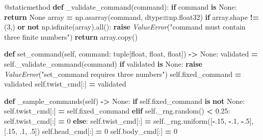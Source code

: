 \documentclass[
  chinese,
  11pt,
  letterpaper,
]{article}
\newenvironment{Shaded}{\begin{snugshade}}{\end{snugshade}}
\newcommand{\AttributeTok}[1]{\textcolor[rgb]{0.13,0.29,0.53}{#1}}
\newcommand{\BuiltInTok}[1]{#1}
\newcommand{\ControlFlowTok}[1]{\textcolor[rgb]{0.13,0.29,0.53}{\textbf{#1}}}
\newcommand{\DecValTok}[1]{\textcolor[rgb]{0.00,0.00,0.81}{#1}}
\newcommand{\FloatTok}[1]{\textcolor[rgb]{0.00,0.00,0.81}{#1}}
\newcommand{\KeywordTok}[1]{\textcolor[rgb]{0.13,0.29,0.53}{\textbf{#1}}}
\newcommand{\NormalTok}[1]{#1}
\newcommand{\OperatorTok}[1]{\textcolor[rgb]{0.81,0.36,0.00}{\textbf{#1}}}
\newcommand{\PreprocessorTok}[1]{\textcolor[rgb]{0.56,0.35,0.01}{\textit{#1}}}
\newcommand{\StringTok}[1]{\textcolor[rgb]{0.31,0.60,0.02}{#1}}
\newcommand{\VariableTok}[1]{\textcolor[rgb]{0.00,0.00,0.00}{#1}}
\renewenvironment{Shaded}{\par\smallskip}{\par\smallskip}
\begin{document}
\begin{Shaded}
\begin{Highlighting}[]
    \AttributeTok{@staticmethod}
    \KeywordTok{def}\NormalTok{ \_validate\_command(command):}
        \ControlFlowTok{if}\NormalTok{ command }\KeywordTok{is} \VariableTok{None}\NormalTok{:}
            \ControlFlowTok{return} \VariableTok{None}
\NormalTok{        array }\OperatorTok{=}\NormalTok{ np.asarray(command, dtype}\OperatorTok{=}\NormalTok{np.float32)}
        \ControlFlowTok{if}\NormalTok{ array.shape }\OperatorTok{!=}\NormalTok{ (}\DecValTok{3}\NormalTok{,) }\KeywordTok{or} \KeywordTok{not}\NormalTok{ np.isfinite(array).}\BuiltInTok{all}\NormalTok{():}
            \ControlFlowTok{raise} \PreprocessorTok{ValueError}\NormalTok{(}\StringTok{"command must contain three finite numbers"}\NormalTok{)}
        \ControlFlowTok{return}\NormalTok{ array.copy()}

    \KeywordTok{def}\NormalTok{ set\_command(}\VariableTok{self}\NormalTok{, command: }\BuiltInTok{tuple}\NormalTok{[}\BuiltInTok{float}\NormalTok{, }\BuiltInTok{float}\NormalTok{, }\BuiltInTok{float}\NormalTok{]) }\OperatorTok{{-}\textgreater{}} \VariableTok{None}\NormalTok{:}
\NormalTok{        validated }\OperatorTok{=} \VariableTok{self}\NormalTok{.\_validate\_command(command)}
        \ControlFlowTok{if}\NormalTok{ validated }\KeywordTok{is} \VariableTok{None}\NormalTok{:}
            \ControlFlowTok{raise} \PreprocessorTok{ValueError}\NormalTok{(}\StringTok{"set\_command requires three numbers"}\NormalTok{)}
        \VariableTok{self}\NormalTok{.fixed\_command }\OperatorTok{=}\NormalTok{ validated}
        \VariableTok{self}\NormalTok{.twist\_cmd[:] }\OperatorTok{=}\NormalTok{ validated}

    \KeywordTok{def}\NormalTok{ \_sample\_commands(}\VariableTok{self}\NormalTok{) }\OperatorTok{{-}\textgreater{}} \VariableTok{None}\NormalTok{:}
        \ControlFlowTok{if} \VariableTok{self}\NormalTok{.fixed\_command }\KeywordTok{is} \KeywordTok{not} \VariableTok{None}\NormalTok{:}
            \VariableTok{self}\NormalTok{.twist\_cmd[:] }\OperatorTok{=} \VariableTok{self}\NormalTok{.fixed\_command}
        \ControlFlowTok{elif} \VariableTok{self}\NormalTok{.\_rng.random() }\OperatorTok{\textless{}} \FloatTok{0.25}\NormalTok{:}
            \VariableTok{self}\NormalTok{.twist\_cmd[:] }\OperatorTok{=} \DecValTok{0}
        \ControlFlowTok{else}\NormalTok{:}
            \VariableTok{self}\NormalTok{.twist\_cmd[:] }\OperatorTok{=} \VariableTok{self}\NormalTok{.\_rng.uniform([}\OperatorTok{{-}}\FloatTok{.15}\NormalTok{, }\OperatorTok{{-}}\FloatTok{.1}\NormalTok{, }\OperatorTok{{-}}\FloatTok{.5}\NormalTok{], [}\FloatTok{.15}\NormalTok{, }\FloatTok{.1}\NormalTok{, }\FloatTok{.5}\NormalTok{])}
        \VariableTok{self}\NormalTok{.head\_cmd[:] }\OperatorTok{=} \DecValTok{0}
        \VariableTok{self}\NormalTok{.body\_cmd[:] }\OperatorTok{=} \DecValTok{0}


\end{Highlighting}
\end{Shaded}
\end{document}
